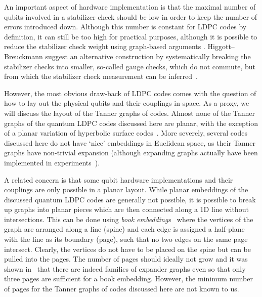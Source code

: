 \documentclass[amsmath, amssymb, floatfix, reprint, twocolumn, notitlepage, 10pt]{revtex4-1}
\newcommand{\change}{}
\begin{document}
An important aspect of hardware implementation is that the maximal number of qubits involved in a stabilizer check should be low in order to keep the number of errors introduced down.
Although this number is constant for LDPC codes by definition, it can still be too high for practical purposes, although it is possible to reduce the stabilizer check weight using graph-based arguments \cite{hastings2016weight,hastingsreduction}.
Higgott--Breuckmann suggest an alternative construction by systematically breaking the stabilizer checks into smaller, so-called gauge checks, which do not commute, but from which the stabilizer check measurement can be inferred~\cite{higgott2020subsystem}.

However, the most obvious draw-back of LDPC codes comes with the question of how to lay out the physical qubits and their couplings in space.
As a proxy, we will discuss the layout of the Tanner graphs of codes.
Almost none of the Tanner graphs of the quantum LDPC codes discussed here are planar, with the exception of a planar variation of hyperbolic surface codes~\cite{breuckmann2016constructions}.
More severely, several codes discussed here do not have `nice' embeddings in Euclidean space, as their Tanner graphs have non-trivial expansion (although expanding graphs actually have been implemented in experiments~\cite{kollar2019hyperbolic}).

{\change A related concern is that some qubit hardware implementations and their couplings are only possible in a planar layout.}
While planar embeddings of the discussed quantum LDPC codes are generally not possible, it is possible to break up graphs into planar pieces which are then connected along a 1D line without intersections.
This can be done using \emph{book embeddings}~\cite{bilski1992embedding} where the vertices of the graph are arranged along a line (spine) and each edge is assigned a half-plane with the line as its boundary (page), such that no two edges on the same page intersect.
Clearly, the vertices do not have to be placed on the spine but can be pulled into the pages.
The number of pages should ideally not grow and it was shown in~\cite{dujmovic2015layouts} that there are indeed families of expander graphs even so that only three pages are sufficient for a book embedding.
However, the minimum number of pages for the Tanner graphs of codes discussed here are not known to us.
\end{document}
